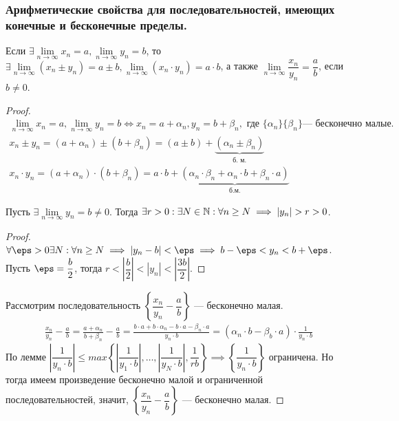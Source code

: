 \documentclass[12pt, a4paper]{article}
\begin{document}
	\subsubsection{Арифметические свойства для последовательностей, имеющих конечные и бесконечные пределы.} 
	Если $\exists \lim\limits_{n \to \infty} x_n = a, \lim\limits_{n \to \infty} y_n = b$, то $\exists \lim\limits_{n \to \infty} (x_n \pm y_n) = a \pm b, \lim\limits_{n \to \infty} (x_n \cdot y_n) = a \cdot b$, а также $\lim\limits_{n \to \infty} \dfrac{x_n}{y_n} = \dfrac{a}{b}$, если $b \neq 0$.
	\begin{proof}
		\[\begin{gathered}
			\lim_{n \to \infty} x_n = a, \lim_{n \to \infty} y_n = b \iff x_n = a + \alpha_n, y_n = b + \beta_n, \text{ где } \{\alpha_n\} \{\beta_n\} \text{--- бесконечно малые.} \\
			x_n \pm y_n = (a + \alpha_n) \pm (b + \beta_n) = (a \pm b) + \underbrace{(\alpha_n \pm \beta_n)}_{\text{б. м.}} \\
			x_n \cdot y_n = (a + \alpha_n) \cdot (b + \beta_n) = a \cdot b + \underbrace{(\alpha_n \cdot \beta_n + \alpha_n \cdot b + \beta_n \cdot a)}_{\text{б.м.}}
		\end{gathered}\]
		\begin{lemma}
			Пусть $\exists \lim\limits_{n \to \infty} y_n = b \neq 0$. Тогда $\exists r > 0: \exists N \in \mathbb{N}: \forall n \geq N \implies |y_n| > r > 0$.
		\end{lemma}
		\begin{proof}
			$\forall \eps > 0 \exists N: \forall n \geq N \implies |y_n - b| < \eps \implies b - \eps < y_n < b + \eps$. Пусть $\eps = \dfrac{b}{2}$, тогда $r < \left|\dfrac{b}{2}\right| < |y_n| < \left|\dfrac{3b}{2}\right|$.
		\end{proof}
		Рассмотрим последовательность $\left\{\dfrac{x_n}{y_n} - \dfrac{a}{b}\right\}$ --- бесконечно малая.
		\[\begin{gathered}
			\frac{x_n}{y_n} - \frac{a}{b} = \frac{a + \alpha_n}{b + \beta_n} - \frac{a}{b}
			= \frac{b \cdot a + b \cdot \alpha_n - b \cdot a - \beta_n \cdot a}{y_n \cdot b}
			= (\alpha_n \cdot b - \beta_b \cdot a) \cdot \frac{1}{y_n \cdot b}
		\end{gathered}\]
		По лемме $\left|\dfrac{1}{y_n \cdot b}\right| \leq max\left\{\left|\dfrac{1}{y_1 \cdot b}\right|, \dots, \left|\dfrac{1}{y_N \cdot b}\right|, \dfrac{1}{rb} \right\} \implies \left\{\dfrac{1}{y_n \cdot b}\right\}$ ограничена. Но тогда имеем произведение бесконечно малой и ограниченной последовательностей, значит, $\left\{\dfrac{x_n}{y_n} - \dfrac{a}{b}\right\}$ --- бесконечно малая.
	\end{proof}
\end{document}
